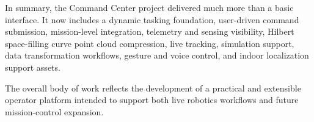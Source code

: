 \documentclass[11pt]{article}
\begin{document}
In summary, the Command Center project delivered much more than a basic interface. It now includes a dynamic tasking foundation, user-driven command submission, mission-level integration, telemetry and sensing visibility, Hilbert space-filling curve point cloud compression, live tracking, simulation support, data transformation workflows, gesture and voice control, and indoor localization support assets.

The overall body of work reflects the development of a practical and extensible operator platform intended to support both live robotics workflows and future mission-control expansion.
\end{document}
